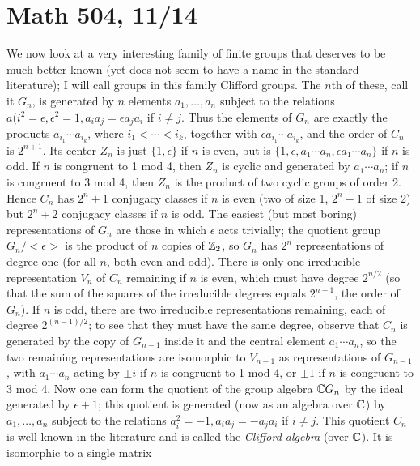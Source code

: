 \documentclass[10pt]{article}
\begin{document}
\section*{Math 504, 11/14}

We now look at a very interesting family of finite groups that deserves
to be much better known (yet does not seem to have a name in the
standard literature); I will call groups in this family Clifford groups.
The $n$th of these, call it $G_n$, is generated by $n$ elements
$a_1,\ldots,a_n$ subject to the relations $a(i^2 = \epsilon,\epsilon^2 =
1, a_i a_j = \epsilon a_j a_i$ if $i\ne j$. Thus the elements of $G_n$
are exactly the products $a_{i_1}\cdots a_{i_k}$, where $i_1 < \cdots <
i_k$, together with $\epsilon a_{i_1}\cdots a_{i_k}$, and the order of
$C_n$ is $2^{n+1}$. Its center $Z_n$ is just $\{1,\epsilon\}$ if $n$ is
even, but is $\{1,\epsilon,a_1\cdots a_n,\epsilon a_1\cdots a_n\}$ if
$n$ is odd. If $n$ is congruent to 1 mod 4, then $Z_n$ is cyclic and
generated by $a_1\cdots a_n$; if $n$ is congruent to 3 mod 4, then $Z_n$
is the product of two cyclic groups of order 2. Hence $C_n$ has $2^n +
1$ conjugacy classes if $n$ is even (two of size 1, $2^n - 1$ of size 2)
but $2^n + 2$ conjugacy classes if $n$ is odd. The easiest (but most
boring) representations of $G_n$ are those in which $\epsilon$ acts
trivially; the quotient group $G_n/<\epsilon>$ is the product of $n$
copies of $\Bbb Z_2$, so $G_n$ has $2^n$ representations of degree one
(for all $n$, both even and odd). There is only one irreducible
representation $V_n$ of $C_n$ remaining if $n$ is even, which must have
degree $2^{n/2}$ (so that the sum of the squares of the irreducible
degrees equals $2^{n+1}$, the order of $G_n$). If $n$ is odd, there are
two irreducible representations remaining, each of degree $2^{(n-1)/2}$;
to see that they must have the same degree, observe that $C_n$ is
generated by the copy of $G_{n-1}$ inside it and the central element
$a_1\cdots a_n$, so the two remaining representations are isomorphic to
$V_{n-1}$ as representations of $G_{n-1}$, with $a_1\cdots a_n$ acting
by $\pm i$ if $n$ is congruent to 1 mod 4, or $\pm 1$ if $n$ is
congruent to 3 mod 4. Now one can form the quotient of the group algebra
$\Bbb C G_n$ by the ideal generated by $\epsilon+1$; this quotient is
generated (now as an algebra over $\Bbb C$) by $a_1,\ldots,a_n$ subject
to the relations $a_i^2 = -1, a_i a_j = - a_j a_i$ if $i\ne j$. This
quotient $C_n$ is well known in the literature and is called the {\sl
  Clifford algebra} (over $\Bbb C$). It is isomorphic to a single matrix
\end{document}
